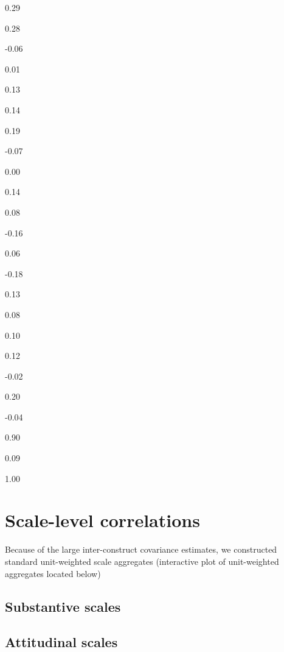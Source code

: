\documentclass[
]{book}
\begin{document}
0.29

0.28

-0.06

0.01

0.13

0.14

0.19

-0.07

0.00

0.14

0.08

-0.16

0.06

-0.18

0.13

0.08

0.10

0.12

-0.02

0.20

-0.04

0.90

0.09

1.00

\hypertarget{scale-level-correlations}{%
\section{Scale-level correlations}\label{scale-level-correlations}}

Because of the large inter-construct covariance estimates, we constructed standard unit-weighted scale aggregates (interactive plot of unit-weighted aggregates located below)

\hypertarget{substantive-scales}{%
\subsection{Substantive scales}\label{substantive-scales}}

\hypertarget{htmlwidget-3ca32e6ad2e94128bc1e}{}

\hypertarget{attitudinal-scales}{%
\subsection{Attitudinal scales}\label{attitudinal-scales}}

\hypertarget{htmlwidget-2fe2f96742b7c0fe88d2}{}

\hypertarget{section}{%
\section*{}\label{section}}
\end{document}
